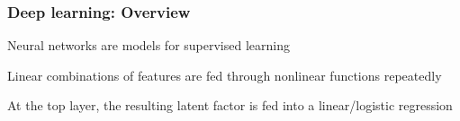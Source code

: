 \documentclass[12pt]{beamer}
\begin{document}
%
%
%
%
%
%
%
%
%


\begin{frame}[fragile]
\frametitle{Deep learning: Overview}
Neural networks are models for supervised learning

\vsp
Linear combinations of features are fed through nonlinear functions repeatedly

\vsp
At the top layer, the resulting latent factor is fed into a linear/logistic regression
\end{frame}
\end{document}
